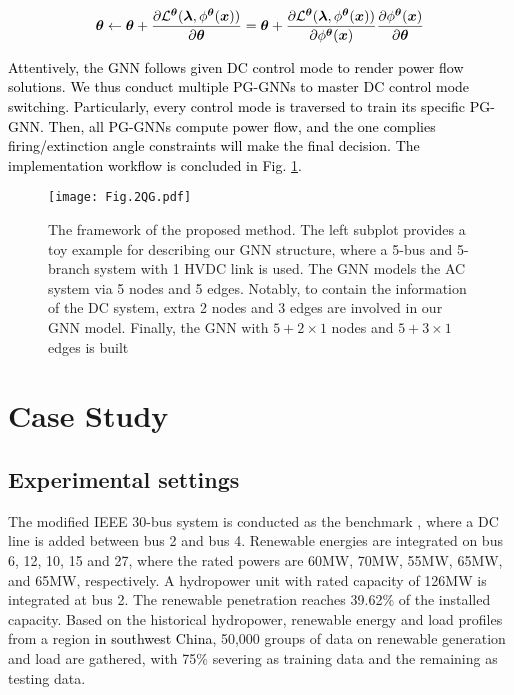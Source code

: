 \documentclass[lettersize,journal]{IEEEtran}
\begin{document}
\vspace{-1.5em}
\begin{eqnarray}
    \label{eq_14}
    \boldsymbol{\theta} \leftarrow \boldsymbol{\theta} + \textcolor{black} { \frac{\partial \mathcal{L}^{\boldsymbol\theta}(\boldsymbol{\lambda},\mathcal{\phi}^{\boldsymbol{\theta}}(\boldsymbol{x}))}{\partial \boldsymbol{\theta}}} = \boldsymbol{\theta} + \textcolor{black}{\frac{\partial\mathcal{L}^{\boldsymbol\theta}(\boldsymbol{\lambda},\mathcal{\phi}^{\boldsymbol{\theta}}(\boldsymbol{x}))}{\partial \mathcal{\phi}^{\boldsymbol{\theta}}(\boldsymbol{x})} \frac{\partial \mathcal{\phi}^{\boldsymbol{\theta}}(\boldsymbol{x})} {\partial \boldsymbol\theta}} 
\end{eqnarray}

\textcolor{black}{Attentively, the GNN follows given DC control mode to render power flow solutions. We thus conduct multiple PG-GNNs to master DC control mode switching. Particularly, every control mode is traversed to train its specific PG-GNN. Then, all PG-GNNs compute power flow, and the one complies firing/extinction angle constraints will make the final decision. The implementation workflow is concluded in Fig. \ref{fig1}.}
\begin{figure}[!t]
\setlength{\abovecaptionskip}{-0.2cm}  %
\setlength{\belowcaptionskip}{-0.2cm} %
\centering
\texttt{[image: Fig.2QG.pdf]}
\caption{The framework of the proposed method. The left subplot provides a toy example for describing our GNN structure, where a 5-bus and 5-branch system with 1 HVDC link is used. The GNN models the AC system via 5 nodes and 5 edges. Notably, to contain the information of the DC system, extra 2 nodes and 3 edges are involved in our GNN model. Finally, the GNN with $5+2 \times 1$ nodes and $5+3 \times 1$ edges is built}
\vspace{-1ex}
\label{fig1}
\vspace{-2ex}
\end{figure}

\vspace{-0.8em}
\section{Case Study}
\subsection{Experimental settings}
The modified IEEE 30-bus system is conducted as the benchmark \cite{r7}, where a DC line is added between bus 2 and bus 4. Renewable energies are integrated on bus 6, 12, 10, 15 and 27, where the rated powers are 60MW, 70MW, 55MW, 65MW, and 65MW, respectively. A hydropower unit with rated capacity of 126MW is integrated at bus 2. The renewable penetration reaches 39.62$ \%$ of the installed capacity. Based on the historical hydropower, renewable energy and load profiles from a region \textcolor{black}{in southwest China}, 50,000 groups of data on renewable generation and load are gathered, with 75$\%$ severing as training data and the remaining as testing data.
\end{document}
